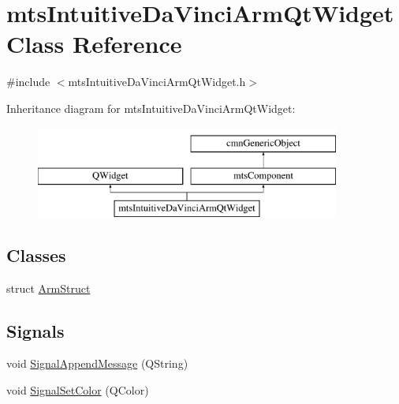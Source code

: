 \hypertarget{classmts_intuitive_da_vinci_arm_qt_widget}{\section{mts\-Intuitive\-Da\-Vinci\-Arm\-Qt\-Widget Class Reference}
\label{classmts_intuitive_da_vinci_arm_qt_widget}
}


{\ttfamily \#include $<$mts\-Intuitive\-Da\-Vinci\-Arm\-Qt\-Widget.\-h$>$}

Inheritance diagram for mts\-Intuitive\-Da\-Vinci\-Arm\-Qt\-Widget\-:\begin{figure}[H]
\begin{center}
\leavevmode
\includegraphics[height=3.000000cm]{d8/d32/classmts_intuitive_da_vinci_arm_qt_widget}
\end{center}
\end{figure}
\subsection*{Classes}
\begin{DoxyCompactItemize}
\item 
struct \hyperlink{structmts_intuitive_da_vinci_arm_qt_widget_1_1_arm_struct}{Arm\-Struct}
\end{DoxyCompactItemize}
\subsection*{Signals}
\begin{DoxyCompactItemize}
\item 
void \hyperlink{classmts_intuitive_da_vinci_arm_qt_widget_af3fb1ebdbc74664a239145062c0311ad}{Signal\-Append\-Message} (Q\-String)
\item 
void \hyperlink{classmts_intuitive_da_vinci_arm_qt_widget_aefb4d032b945c18472d4f05c1d7b1130}{Signal\-Set\-Color} (Q\-Color)
\end{DoxyCompactItemize}
